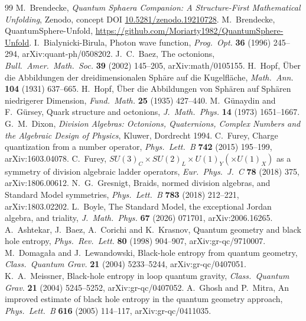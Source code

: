 \documentclass[11pt]{article}
\theoremstyle{definition}
\theoremstyle{remark}
\begin{document}
\begin{thebibliography}{99}
 M.~Brendecke, \emph{Quantum Sphaera Companion: A Structure-First Mathematical Unfolding},
Zenodo, concept DOI \href{https://doi.org/10.5281/zenodo.19210728}{10.5281/zenodo.19210728}.
 M.~Brendecke, QuantumSphere-Unfold, \url{https://github.com/Moriarty1982/QuantumSphere-Unfold}.
 I.~Bialynicki-Birula, Photon wave function, \emph{Prog.\ Opt.} \textbf{36} (1996) 245--294, arXiv:quant-ph/0508202.
 J.~C.~Baez, The octonions, \emph{Bull.\ Amer.\ Math.\ Soc.} \textbf{39} (2002) 145--205, arXiv:math/0105155.
 H.~Hopf, \"Uber die Abbildungen der dreidimensionalen Sph\"are auf die Kugelfl\"ache, \emph{Math.\ Ann.} \textbf{104} (1931) 637--665.
 H.~Hopf, \"Uber die Abbildungen von Sph\"aren auf Sph\"aren niedrigerer Dimension, \emph{Fund.\ Math.} \textbf{25} (1935) 427--440.
 M.~G\"unaydin and F.~G\"ursey, Quark structure and octonions, \emph{J.\ Math.\ Phys.} \textbf{14} (1973) 1651--1667.
 G.~M.~Dixon, \emph{Division Algebras: Octonions, Quaternions, Complex Numbers and the Algebraic Design of Physics}, Kluwer, Dordrecht 1994.
 C.~Furey, Charge quantization from a number operator, \emph{Phys.\ Lett.\ B} \textbf{742} (2015) 195--199, arXiv:1603.04078.
 C.~Furey, \(SU(3)_C\times SU(2)_L\times U(1)_Y(\times U(1)_X)\) as a symmetry of division algebraic ladder operators, \emph{Eur.\ Phys.\ J.\ C} \textbf{78} (2018) 375, arXiv:1806.00612.
 N.~G.~Gresnigt, Braids, normed division algebras, and Standard Model symmetries, \emph{Phys.\ Lett.\ B} \textbf{783} (2018) 212--221, arXiv:1803.02202.
 L.~Boyle, The Standard Model, the exceptional Jordan algebra, and triality, \emph{J.\ Math.\ Phys.} \textbf{67} (2026) 071701, arXiv:2006.16265.
 A.~Ashtekar, J.~Baez, A.~Corichi and K.~Krasnov, Quantum geometry and black hole entropy, \emph{Phys.\ Rev.\ Lett.} \textbf{80} (1998) 904--907, arXiv:gr-qc/9710007.
 M.~Domaga\l{}a and J.~Lewandowski, Black-hole entropy from quantum geometry, \emph{Class.\ Quantum Grav.} \textbf{21} (2004) 5233--5244, arXiv:gr-qc/0407051.
 K.~A.~Meissner, Black-hole entropy in loop quantum gravity, \emph{Class.\ Quantum Grav.} \textbf{21} (2004) 5245--5252, arXiv:gr-qc/0407052.
 A.~Ghosh and P.~Mitra, An improved estimate of black hole entropy in the quantum geometry approach, \emph{Phys.\ Lett.\ B} \textbf{616} (2005) 114--117, arXiv:gr-qc/0411035.

\end{thebibliography}
\end{document}

